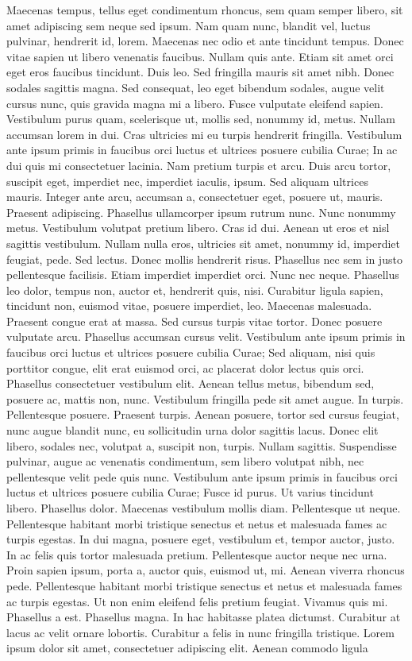 Maecenas tempus, tellus eget condimentum rhoncus, sem quam semper libero, sit amet adipiscing sem neque sed ipsum. Nam quam nunc, blandit vel, luctus pulvinar, hendrerit id, lorem. Maecenas nec odio et ante tincidunt tempus. Donec vitae sapien ut libero venenatis faucibus. Nullam quis ante. Etiam sit amet orci eget eros faucibus tincidunt. Duis leo. Sed fringilla mauris sit amet nibh. Donec sodales sagittis magna. Sed consequat, leo eget bibendum sodales, augue velit cursus nunc, quis gravida magna mi a libero. Fusce vulputate eleifend sapien. Vestibulum purus quam, scelerisque ut, mollis sed, nonummy id, metus. Nullam accumsan lorem in dui. Cras ultricies mi eu turpis hendrerit fringilla. Vestibulum ante ipsum primis in faucibus orci luctus et ultrices posuere cubilia Curae; In ac dui quis mi consectetuer lacinia. Nam pretium turpis et arcu. Duis arcu tortor, suscipit eget, imperdiet nec, imperdiet iaculis, ipsum. Sed aliquam ultrices mauris. Integer ante arcu, accumsan a, consectetuer eget, posuere ut, mauris. Praesent adipiscing. Phasellus ullamcorper ipsum rutrum nunc. Nunc nonummy metus. Vestibulum volutpat pretium libero. Cras id dui. Aenean ut eros et nisl sagittis vestibulum. Nullam nulla eros, ultricies sit amet, nonummy id, imperdiet feugiat, pede. Sed lectus. Donec mollis hendrerit risus. Phasellus nec sem in justo pellentesque facilisis. Etiam imperdiet imperdiet orci. Nunc nec neque. Phasellus leo dolor, tempus non, auctor et, hendrerit quis, nisi. Curabitur ligula sapien, tincidunt non, euismod vitae, posuere imperdiet, leo. Maecenas malesuada. Praesent congue erat at massa. Sed cursus turpis vitae tortor. Donec posuere vulputate arcu. Phasellus accumsan cursus velit. Vestibulum ante ipsum primis in faucibus orci luctus et ultrices posuere cubilia Curae; Sed aliquam, nisi quis porttitor congue, elit erat euismod orci, ac placerat dolor lectus quis orci. Phasellus consectetuer vestibulum elit. Aenean tellus metus, bibendum sed, posuere ac, mattis non, nunc. Vestibulum fringilla pede sit amet augue. In turpis. Pellentesque posuere. Praesent turpis. Aenean posuere, tortor sed cursus feugiat, nunc augue blandit nunc, eu sollicitudin urna dolor sagittis lacus. Donec elit libero, sodales nec, volutpat a, suscipit non, turpis. Nullam sagittis. Suspendisse pulvinar, augue ac venenatis condimentum, sem libero volutpat nibh, nec pellentesque velit pede quis nunc. Vestibulum ante ipsum primis in faucibus orci luctus et ultrices posuere cubilia Curae; Fusce id purus. Ut varius tincidunt libero. Phasellus dolor. Maecenas vestibulum mollis diam. Pellentesque ut neque. Pellentesque habitant morbi tristique senectus et netus et malesuada fames ac turpis egestas. In dui magna, posuere eget, vestibulum et, tempor auctor, justo. In ac felis quis tortor malesuada pretium. Pellentesque auctor neque nec urna. Proin sapien ipsum, porta a, auctor quis, euismod ut, mi. Aenean viverra rhoncus pede. Pellentesque habitant morbi tristique senectus et netus et malesuada fames ac turpis egestas. Ut non enim eleifend felis pretium feugiat. Vivamus quis mi. Phasellus a est. Phasellus magna. In hac habitasse platea dictumst. Curabitur at lacus ac velit ornare lobortis. Curabitur a felis in nunc fringilla tristique. Lorem ipsum dolor sit amet, consectetuer adipiscing elit. Aenean commodo ligula 